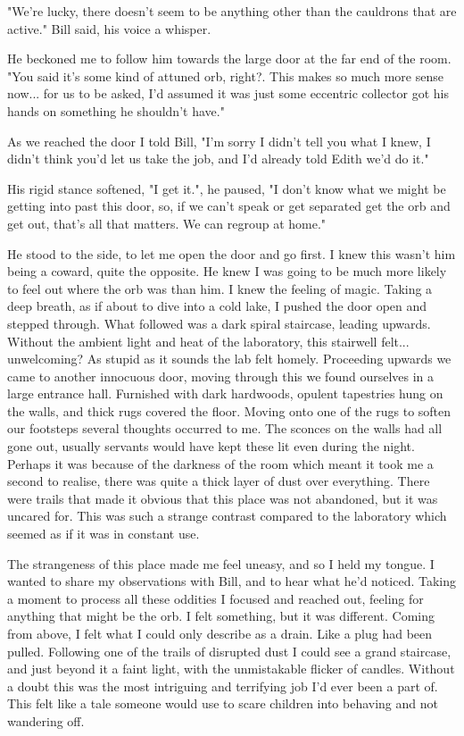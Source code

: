 \begin{dialogue}
    \item{"We're lucky, there doesn't seem to be anything other than the cauldrons that are active." Bill said, his voice a whisper.}
    \item {He beckoned me to follow him towards the large door at the far end of the room. "You said it's some kind of attuned orb, right?. This makes so much more sense now... for us to be asked, I'd assumed it was just some eccentric collector got his hands on something he shouldn't have."}
    \item {As we reached the door I told Bill, "I'm sorry I didn't tell you what I knew, I didn't think you'd let us take the job, and I'd already told Edith we'd do it."}
    \item {His rigid stance softened, "I get it.", he paused, "I don't know what we might be getting into past this door, so, if we can't speak or get separated get the orb and get out, that's all that matters. We can regroup at home."}
\end{dialogue}

He stood to the side, to let me open the door and go first. I knew this wasn't
him being a coward, quite the opposite. He knew I was going to be much more
likely to feel out where the orb was than him. I knew the feeling of magic.
Taking a deep breath, as if about to dive into a cold lake, I pushed the door
open and stepped through. What followed was a dark spiral staircase, leading
upwards. Without the ambient light and heat of the laboratory, this stairwell
felt... unwelcoming? As stupid as it sounds the lab felt homely. Proceeding
upwards we came to another innocuous door, moving through this we found ourselves
in a large entrance hall. Furnished with dark hardwoods, opulent tapestries hung
on the walls, and thick rugs covered the floor. Moving onto one of the rugs to
soften our footsteps several thoughts occurred to me. The sconces on the walls
had all gone out, usually servants would have kept these lit even during the
night. Perhaps it was because of the darkness of the room which meant it took me
a second to realise, there was quite a thick layer of dust over everything.
There were trails that made it obvious that this place was not abandoned, but it
was uncared for. This was such a strange contrast compared to the laboratory
which seemed as if it was in constant use. 

The strangeness of this place made me feel uneasy, and so I held my tongue. I
wanted to share my observations with Bill, and to hear what he'd noticed. Taking
a moment to process all these oddities I focused and reached out, feeling for
anything that might be the orb. I felt something, but it was different. Coming
from above, I felt what I could only describe as a drain. Like a plug had been
pulled. Following one of the trails of disrupted dust I could see a grand
staircase, and just beyond it a faint light, with the unmistakable flicker of
candles. Without a doubt this was the most intriguing and terrifying job I'd
ever been a part of. This felt like a tale someone would use to scare children
into behaving and not wandering off.

